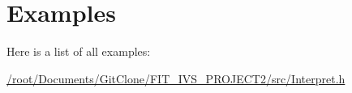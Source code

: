 \section{Examples}
Here is a list of all examples\+:\begin{DoxyCompactItemize}
\item 
\hyperlink{_2root_2_documents_2_git_clone_2_f_i_t__i_v_s__p_r_o_j_e_c_t2_2src_2_interpret_8h-example}{/root/\+Documents/\+Git\+Clone/\+F\+I\+T\+\_\+\+I\+V\+S\+\_\+\+P\+R\+O\+J\+E\+C\+T2/src/\+Interpret.\+h}
\end{DoxyCompactItemize}
